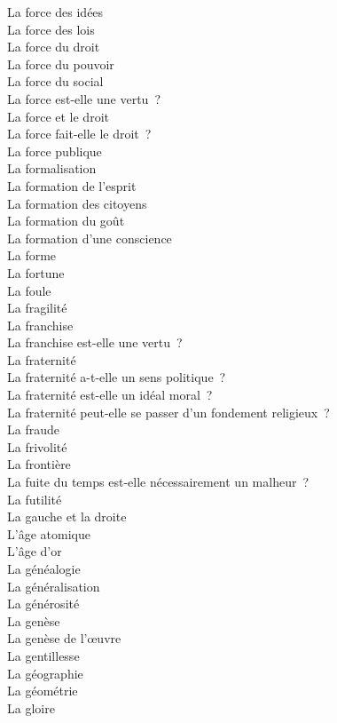 \documentclass[a4paper,12pt]{article}
\begin{document}
La force des idées \\
La force des lois \\
La force du droit \\
La force du pouvoir \\
La force du social \\
La force est-elle une vertu ? \\
La force et le droit \\
La force fait-elle le droit ? \\
La force publique \\
La formalisation \\
La formation de l'esprit \\
La formation des citoyens \\
La formation du goût \\
La formation d'une conscience \\
La forme \\
La fortune \\
La foule \\
La fragilité \\
La franchise \\
La franchise est-elle une vertu ? \\
La fraternité \\
La fraternité a-t-elle un sens politique ? \\
La fraternité est-elle un idéal moral ? \\
La fraternité peut-elle se passer d'un fondement religieux ? \\
La fraude \\
La frivolité \\
La frontière \\
La fuite du temps est-elle nécessairement un malheur ? \\
La futilité \\
La gauche et la droite \\
L'âge atomique \\
L'âge d'or \\
La généalogie \\
La généralisation \\
La générosité \\
La genèse \\
La genèse de l'œuvre \\
La gentillesse \\
La géographie \\
La géométrie \\
La gloire \\
\end{document}
